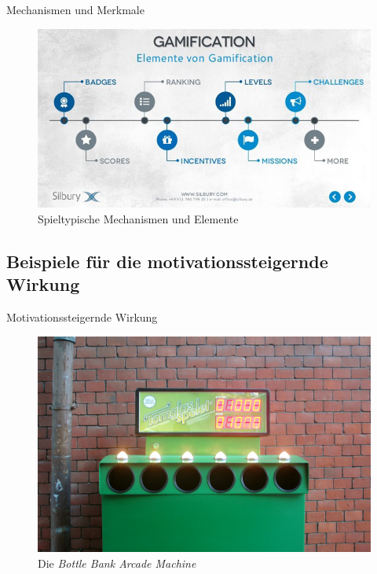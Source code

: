 \documentclass[hyphens]{beamer}
\begin{document}
\begin{frame}{Mechanismen und Merkmale}
\begin{figure}
	\includegraphics[scale=0.45]{pics/elements}
	\caption{Spieltypische Mechanismen und Elemente}
\end{figure}
\end{frame}

\subsection{Beispiele für die motivationssteigernde Wirkung}

\begin{frame}{Motivationssteigernde Wirkung}
\begin{figure}
	\includegraphics[scale=1.0]{pics/bottle}
	\caption{Die \textit{Bottle Bank Arcade Machine}}
\end{figure}
\end{frame}
\end{document}
